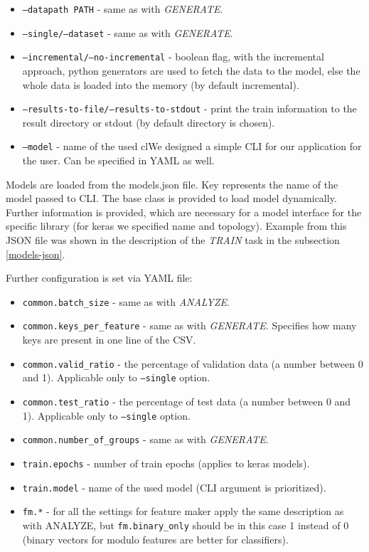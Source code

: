 \begin{itemize}

\item \texttt{--datapath PATH} - same as with \textit{GENERATE}.
\item \texttt{--single/--dataset} - same as with \textit{GENERATE}.
\item \texttt{--incremental/--no-incremental} - boolean flag, with the incremental approach, python generators are used to fetch the data to the model, else the whole data is loaded into the memory (by default incremental).
\item \texttt{--results-to-file/--results-to-stdout} - print the train information to the result directory or stdout (by default directory is chosen).
\item \texttt{--model} - name of the used clWe designed a simple CLI for our application for the user. Can be specified in YAML as well.

\end{itemize}

Models are loaded from the models.json file. Key represents the name of the model passed to CLI. The base class is provided to load model dynamically. Further information is provided, which are necessary for a model interface for the specific library (for keras we specified name and topology). Example from this JSON file was shown in the description of the \textit{TRAIN} task in the subsection \ref{models-json}.

Further configuration is set via YAML file:

\begin{itemize}

\item \texttt{common.batch\_size} - same as with \textit{ANALYZE}.
\item \texttt{common.keys\_per\_feature} - same as with \textit{GENERATE}. Specifies how many keys are present in one line of the CSV.
\item \texttt{common.valid\_ratio} - the percentage of validation data (a number between 0 and 1). Applicable only to \texttt{--single} option.
\item \texttt{common.test\_ratio} - the percentage of test data (a number between 0 and 1). Applicable only to \texttt{--single} option.
\item \texttt{common.number\_of\_groups} - same as with \textit{GENERATE}.
\item \texttt{train.epochs} - number of train epochs (applies to keras models).
\item \texttt{train.model} - name of the used model (CLI argument is prioritized).
\item \texttt{fm.*} - for all the settings for feature maker  apply the same description as with ANALYZE, but \texttt{fm.binary\_only} should be in this case 1 instead of 0 (binary vectors for modulo features are better for classifiers).

\end{itemize}

